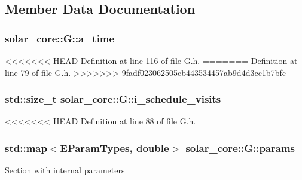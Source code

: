 \subsection{Member Data Documentation}
\hypertarget{classsolar__core_1_1_g_a4d5b2845fc790c0f14b13fe922821f4b}{}
\subsubsection[{a\+\_\+time}]{ solar\+\_\+core\+::\+G\+::a\+\_\+time\hspace{0.3cm}{\ttfamily [protected]}}\label{classsolar__core_1_1_g_a4d5b2845fc790c0f14b13fe922821f4b}


<<<<<<< HEAD
Definition at line 116 of file G.\+h.
=======
Definition at line 79 of file G.\+h.
>>>>>>> 9fadf023062505cb443534457ab9d4d3cc1b7bfc

\hypertarget{classsolar__core_1_1_g_a5c79440fcadc7d3e9212c5e7c05f84f7}{}
\subsubsection[{i\+\_\+schedule\+\_\+visits}]{\setlength{\rightskip}{0pt plus 5cm}std\+::size\+\_\+t solar\+\_\+core\+::\+G\+::i\+\_\+schedule\+\_\+visits\hspace{0.3cm}{\ttfamily [protected]}}\label{classsolar__core_1_1_g_a5c79440fcadc7d3e9212c5e7c05f84f7}


<<<<<<< HEAD
Definition at line 88 of file G.\+h.

\hypertarget{classsolar__core_1_1_g_a045f1db40b15301ed5ec8aefb5327b0e}{}
\subsubsection[{params}]{\setlength{\rightskip}{0pt plus 5cm}std\+::map$<${\bf E\+Param\+Types}, double$>$ solar\+\_\+core\+::\+G\+::params\hspace{0.3cm}{\ttfamily [protected]}}\label{classsolar__core_1_1_g_a045f1db40b15301ed5ec8aefb5327b0e}
Section with internal parameters 

